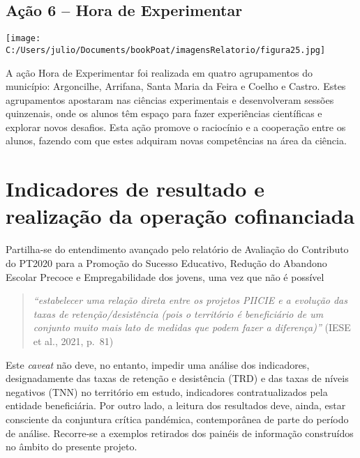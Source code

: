 \documentclass[
]{book}
\begin{document}
\hypertarget{auxe7uxe3o-6-hora-de-experimentar}{%
\subsection{\texorpdfstring{\textbf{Ação 6 -- Hora de Experimentar }}{Ação 6 -- Hora de Experimentar }}\label{auxe7uxe3o-6-hora-de-experimentar}}

\texttt{[image: C:/Users/julio/Documents/bookPoat/imagensRelatorio/figura25.jpg]}

A ação Hora de Experimentar foi realizada em quatro agrupamentos do município: Argoncilhe, Arrifana, Santa Maria da Feira e Coelho e Castro. Estes agrupamentos apostaram nas ciências experimentais e desenvolveram sessões quinzenais, onde os alunos têm espaço para fazer experiências científicas e explorar novos desafios. Esta ação promove o raciocínio e a cooperação entre os alunos, fazendo com que estes adquiram novas competências na área da ciência.

\hypertarget{indicadores-de-resultado-e-realizauxe7uxe3o-da-operauxe7uxe3o-cofinanciada}{%
\section{\texorpdfstring{\textbf{Indicadores de resultado e realização da operação cofinanciada}}{Indicadores de resultado e realização da operação cofinanciada}}\label{indicadores-de-resultado-e-realizauxe7uxe3o-da-operauxe7uxe3o-cofinanciada}}

Partilha-se do entendimento avançado pelo relatório de Avaliação do Contributo do PT2020 para a Promoção do Sucesso Educativo, Redução do Abandono Escolar Precoce e Empregabilidade dos jovens, uma vez que não é possível

\begin{quote}
\emph{``estabelecer uma relação direta entre os projetos PIICIE e a evolução das taxas de retenção/desistência (pois o território é beneficiário de um conjunto muito mais lato de medidas que podem fazer a diferença)''} (IESE et al., 2021, p.~81)
\end{quote}

Este \emph{caveat} não deve, no entanto, impedir uma análise dos indicadores, designadamente das taxas de retenção e desistência (TRD) e das taxas de níveis negativos (TNN) no território em estudo, indicadores contratualizados pela entidade beneficiária. Por outro lado, a leitura dos resultados deve, ainda, estar consciente da conjuntura crítica pandémica, contemporânea de parte do período de análise. Recorre-se a exemplos retirados dos painéis de informação construídos no âmbito do presente projeto.
\end{document}
